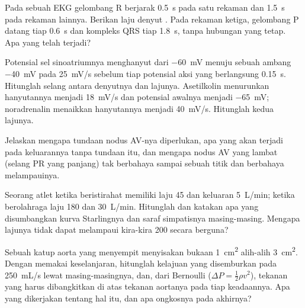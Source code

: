 \begin{exercise}[$\star\star$]\label{exo:b2:heart:7}
Pada sebuah EKG gelombang R berjarak \qty{0.5}{s} pada satu rekaman dan
\qty{1.5}{s} pada rekaman lainnya. Berikan laju denyut . Pada
rekaman ketiga, gelombang P datang tiap \qty{0.6}{s} dan kompleks QRS
tiap \qty{1.8}{s}, tanpa hubungan yang tetap. Apa yang telah terjadi?
\end{exercise}

\begin{exercise}[$\star\star$]\label{exo:b2:heart:8}
Potensial sel sinoatriumnya menghanyut dari \qty{-60}{mV} menuju sebuah
ambang \qty{-40}{mV} pada \qty{25}{mV/s} sebelum tiap potensial aksi
yang berlangsung \qty{0.15}{s}. Hitunglah selang antara denyutnya dan
lajunya. Asetilkolin menurunkan hanyutannya menjadi \qty{18}{mV/s} dan
potensial awalnya menjadi \qty{-65}{mV}; noradrenalin menaikkan
hanyutannya menjadi \qty{40}{mV/s}. Hitunglah kedua lajunya.
\end{exercise}

\begin{exercise}[$\star\star$]\label{exo:b2:heart:9}
Jelaskan mengapa tundaan nodus AV-nya diperlukan, apa yang akan terjadi
pada keluarannya tanpa tundaan itu, dan mengapa nodus AV yang lambat
(selang PR yang panjang) tak berbahaya sampai sebuah titik dan
berbahaya melampauinya.
\end{exercise}

\begin{exercise}[$\star\star\star$]\label{exo:b2:heart:10}
Seorang atlet ketika beristirahat memiliki laju 45 dan keluaran
\qty{5}{L/min}; ketika berolahraga laju 180 dan \qty{30}{L/min}.
Hitunglah  dan katakan apa yang disumbangkan kurva
Starlingnya dan saraf simpatisnya masing-masing. Mengapa lajunya tidak
dapat melampaui kira-kira 200 secara berguna?
\end{exercise}

\begin{exercise}[$\star\star\star$]\label{exo:b2:heart:11}
Sebuah katup aorta yang menyempit menyisakan bukaan \qty{1}{cm^2}
alih-alih \qty{3}{cm^2}. Dengan memakai keselanjaran, hitunglah
kelajuan  yang disemburkan pada \qty{250}{mL/s} lewat
masing-masingnya, dan, dari Bernoulli ($\Delta P = \tfrac12\rho v^2$),
tekanan yang harus dibangkitkan  di atas tekanan aortanya pada
tiap keadaannya. Apa yang dikerjakan  tentang hal itu, dan apa
ongkosnya pada akhirnya?
\end{exercise}

